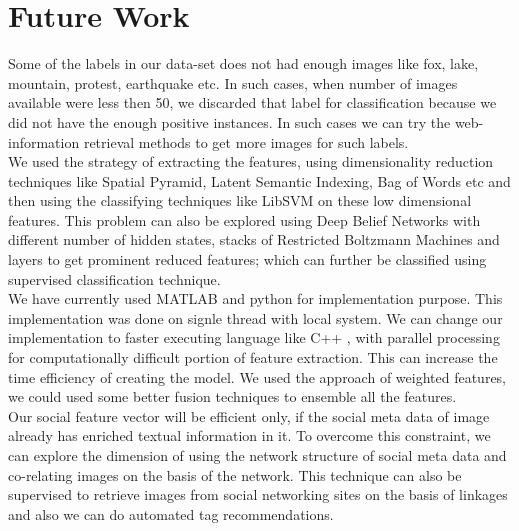  \section{Future Work}
 Some of the labels in our data-set does not had enough images like fox, lake, mountain, protest, earthquake etc. In such cases, when number of images available were less then 50, we discarded that label for classification because we did not have the enough positive instances. In such cases we can try the web-information retrieval methods to get more images for such labels.\\
  We used the strategy of extracting the features, using dimensionality reduction techniques like Spatial Pyramid, Latent Semantic Indexing, Bag of Words etc  and then using the classifying techniques like LibSVM on these low dimensional features.
  This problem can also be explored using Deep Belief Networks \cite{dbn} with different number of hidden states, stacks of Restricted Boltzmann Machines and layers to get prominent reduced features; which can further be classified using supervised classification technique.\\
   We have currently used MATLAB and python for implementation purpose. This implementation was done on signle thread with local system. We can change our implementation to faster executing language like C++ , with parallel processing for computationally difficult portion of feature extraction. This can increase the time efficiency of creating the model. We used the approach of weighted features, we could used some better fusion techniques to ensemble all the features.\\
   Our social feature vector will be efficient only, if the social meta data of image already has enriched textual information in it. To overcome this constraint, we can explore the dimension of using the network structure of social meta data and co-relating images on the basis of the network. This technique can also be supervised to retrieve images from social networking sites on the basis of linkages and also we can do automated tag recommendations.\\ 





